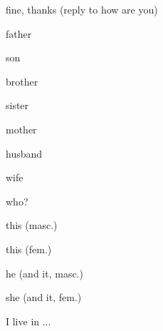 \documentclass[avery5371,grid,frame]{flashcards}
\begin{document}
\begin{flashcard}{\LARGE fine, thanks (reply to how are you)}
\LARGE {}
\end{flashcard}
\begin{flashcard}{\LARGE father}
\LARGE {}
\end{flashcard}
\begin{flashcard}{\LARGE son}
\LARGE {}
\end{flashcard}
\begin{flashcard}{\LARGE brother}
\LARGE {}
\end{flashcard}
\begin{flashcard}{\LARGE sister}
\LARGE {}
\end{flashcard}
\begin{flashcard}{\LARGE mother}
\LARGE {}
\end{flashcard}
\begin{flashcard}{\LARGE husband}
\LARGE {}
\end{flashcard}
\begin{flashcard}{\LARGE wife}
\LARGE {}
\end{flashcard}
\begin{flashcard}{\LARGE who?}
\LARGE {}
\end{flashcard}
\begin{flashcard}{\LARGE this (masc.)}
\LARGE {}
\end{flashcard}
\begin{flashcard}{\LARGE this (fem.)}
\LARGE {}
\end{flashcard}
\begin{flashcard}{\LARGE he (and it, masc.)}
\LARGE {}
\end{flashcard}
\begin{flashcard}{\LARGE she (and it, fem.)}
\LARGE {}
\end{flashcard}
\begin{flashcard}{\LARGE I live in ...}
\LARGE {}
\end{flashcard}
\end{document}
